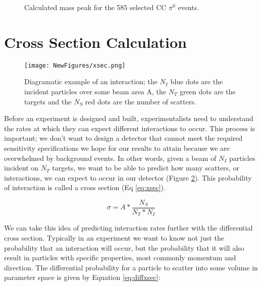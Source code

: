 \documentclass[12pt]{article}
\begin{document}
\begin{figure}[h!]
\centering
{}
\caption{Calculated mass peak for the 585 selected CC $\pi^0$ events. }
\label{fig:mass}
\end{figure}



\newpage
\section {Cross Section Calculation}

\begin{figure}[H]
\centering
\texttt{[image: NewFigures/xsec.png]}
\caption{ Diagramatic example of an interaction; the $N_I$ blue dots are the incident particles over some beam area A, the $N_T$ green dots are the targets and the $N_S$ red dots are the number of scatters.}  
\label{fig:Xsec}
\end{figure}

Before an experiment is designed and built, experimentalists need to understand the rates at which they can expect different interactions to occur. This process is important; we don't want to design a detector that cannot meet the required sensitivity specifications we hope for our results to attain because we are overwhelmed by background events. In other words, given a beam of $N_I$ particles incident on $N_T$ targets, we want to be able to predict how many scatters, or interactions, we can expect to occur in our detector (Figure \ref{fig:Xsec}). This probability of interaction is called a cross section (Eq \ref{eq:xsec}). 

\begin{equation}
\sigma = A * \frac{N_S}{N_T * N_I}
\label{eq:xsec}
\end{equation}


\par We can take this idea of predicting interaction rates further with the differential cross section.  Typically in an experiment we want to know not just the probability that an interaction will occur, but the probability that it will also result in particles with specific properties, most commonly momentum and direction. The differential probability for a particle to scatter into some volume in parameter space is given by Equation \ref{eq:diffxsec}:
\end{document}
